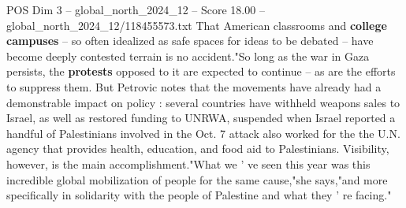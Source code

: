 \begin{textsample}{POS Dim 3 – global\_north\_2024\_12 – Score 18.00 – global\_north\_2024\_12/118455573.txt}
That American classrooms and \textbf{college} \textbf{campuses} -- so often idealized as safe spaces for ideas to be debated -- have become deeply contested terrain is no accident."So long as the war in Gaza persists, the \textbf{protests} opposed to it are expected to continue -- as are the efforts to suppress them.
But Petrovic notes that the movements have already had a demonstrable impact on policy : several countries have withheld weapons sales to Israel, as well as restored funding to UNRWA, suspended when Israel reported a handful of Palestinians involved in the Oct. 7 attack also worked for the the U.N. agency that provides health, education, and food aid to Palestinians.
Visibility, however, is the main accomplishment."What we ' ve seen this year was this incredible global mobilization of people for the same cause,"she says,"and more specifically in solidarity with the people of Palestine and what they ' re facing."

\end{textsample}

